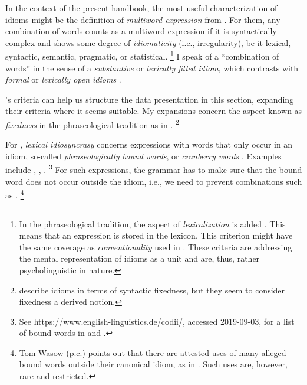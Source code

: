 \documentclass[output=paper
 	        ,biblatex
                ,babelshorthands
                ,newtxmath
                ,draftmode
                ,colorlinks, citecolor=brown
]{langscibook}
\begin{document}

In the context of the present handbook, the most useful characterization of idioms might be the
definition of \emph{multiword expression} from  \citet[]{Baldwin:Kim:10}.
For them, any combination of words counts as a multiword expression if it is syntactically complex
and shows some degree of \emph{idiomaticity} (i.e., irregularity), be it lexical, syntactic,
semantic, pragmatic, or statistical.%
\footnote{In the phraseological tradition, the aspect of \emph{lexicalization} is added
  \citep{Fleischer97a-u,Burger:98}. This means that an expression is stored in the lexicon. This
  criterion might have the same coverage as \emph{conventionality} used in
  \citet[492]{NSW94a}. These criteria are addressing the mental representation of idioms as a
  unit and are, thus, rather psycholinguistic in nature.} 
%
I speak of a ``combination of words'' in the sense of a \emph{substantive} or \emph{lexically filled idiom}, which 
contrasts with \emph{formal} or \emph{lexically open idioms} \citep[505]{FKoC88a}. 

\citeauthor{Baldwin:Kim:10}'s criteria can help us structure the data presentation in this section, expanding their criteria where it seems suitable.
My expansions concern the aspect known as \emph{fixedness} in the phraseological tradition as in \citet{Fleischer97a-u}.%
\footnote{\citet{Baldwin:Kim:10} describe idioms in terms of syntactic fixedness, but they seem to consider fixedness a derived notion.}

\begin{sloppypar}
%
For \citet{Baldwin:Kim:10}, \emph{lexical idiosyncrasy} concerns expressions with words that only
occur in an idiom, so-called \emph{phraseologically bound words}, or \emph{cranberry
  words} \citep[]{Aronoff76a-u}. Examples include , 
,
.%
\footnote{
See https://www.english-linguistics.de/codii/, accessed 2019-09-03, for a list of bound words in  and  \citep{Trawinski:al:08lrec}.}
For such expressions, the grammar has to make sure that the bound word does not occur outside the idiom, i.e., we need to prevent combinations such as .%
\footnote{Tom Wasow (p.c.) points out that there are attested uses of many alleged bound words outside their canonical idiom, as in . Such uses are, however, rare and restricted.
\zlast
}
\end{sloppypar}
\end{document}
